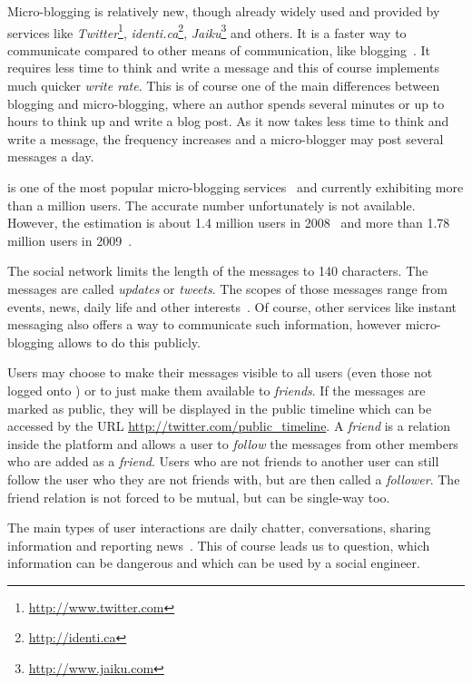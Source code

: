 Micro-blogging is relatively new, though already widely used and
provided by services like
\textit{Twitter}\footnote{\url{http://www.twitter.com}},
\textit{identi.ca}\footnote{\url{http://identi.ca}},
\textit{Jaiku}\footnote{\url{http://www.jaiku.com}} and others. It is a faster
way to communicate compared to other means of communication, like
blogging~\cite{java2007}. It requires less time to think and write a message
and this of course implements much quicker \textit{write rate}. This is of
course one of the main differences between blogging and micro-blogging, where
an author spends several minutes or up to hours to think up and write a blog post. As
it now takes less time to think and write a message, the frequency
increases and a micro-blogger may post several messages a day.

\Twitter{} is one of the most popular micro-blogging services~\cite{java2007}
and currently exhibiting more than a million users. The accurate number
unfortunately is not available. However, the estimation is about 1.4 million
users in 2008~\cite{krishnamurthy2008} and more than 1.78 million users in
2009~\cite{whitworth2009}.

The social network limits the length of the messages to 140 characters. The messages
are called \textit{updates} or \textit{tweets}. The scopes of those messages
range from events, news, daily life and other interests~\cite{java2007}. Of
course, other services like instant messaging also offers a way to communicate
such information, however micro-blogging allows to do this publicly.

Users may choose to make their messages visible to all users (even those not
logged onto \Twitter{}) or to just make them available to \textit{friends}.  If
the messages are marked as public, they will be displayed in the public
timeline which can be accessed by the URL
\url{http://twitter.com/public_timeline}.  A \textit{friend} is a relation
inside the \Twitter{} platform and allows a user to \textit{follow} the
messages from other members who are added as a \textit{friend}. Users who are
not friends to another user can still follow the user who they are not friends
with, but are then called a \textit{follower}. The friend relation is not
forced to be mutual, but can be single-way too.

The main types of user interactions are daily chatter, conversations, sharing
information and reporting news~\cite{java2007}. This of course leads us to
question, which information can be dangerous and which can be used by a social
engineer.

